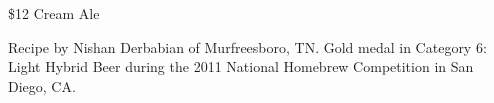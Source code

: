 \stylesection{\stylecreamale}

\begin{recipe}{\$12 Cream Ale}

\begin{aboutblock}
Recipe by Nishan Derbabian of Murfreesboro, TN. Gold medal in Category 6: Light
Hybrid Beer during the 2011 National Homebrew Competition in San Diego, CA.
\sourceaha
\end{aboutblock}


\begin{methodandtiming}

\begin{mashsteps}
\end{mashsteps}

\begin{fermentationsteps}
\end{fermentationsteps}

\end{methodandtiming}

\recipebreak

\begin{ingredientsblock}

\begin{malts}
\end{malts}

\begin{hops}
\end{hops}


\end{ingredientsblock}

\end{recipe}

